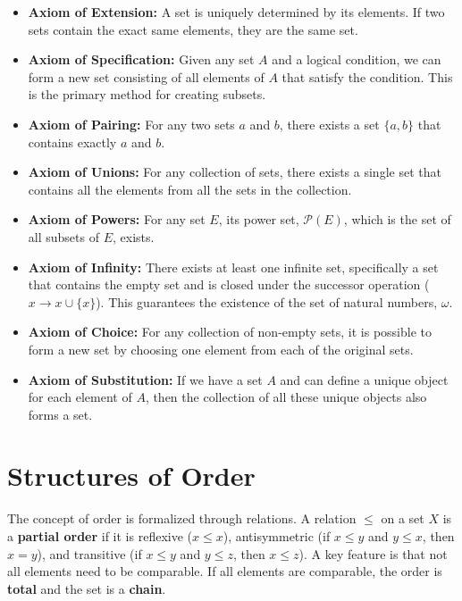\documentclass[11pt, a4paper]{article}
\begin{document}
\begin{itemize}
    \item \textbf{Axiom of Extension:} A set is uniquely determined by its elements. If two sets contain the exact same elements, they are the same set.
    \item \textbf{Axiom of Specification:} Given any set $A$ and a logical condition, we can form a new set consisting of all elements of $A$ that satisfy the condition. This is the primary method for creating subsets.
    \item \textbf{Axiom of Pairing:} For any two sets $a$ and $b$, there exists a set $\{a, b\}$ that contains exactly $a$ and $b$.
    \item \textbf{Axiom of Unions:} For any collection of sets, there exists a single set that contains all the elements from all the sets in the collection.
    \item \textbf{Axiom of Powers:} For any set $E$, its power set, $\mathcal{P}(E)$, which is the set of all subsets of $E$, exists.
    \item \textbf{Axiom of Infinity:} There exists at least one infinite set, specifically a set that contains the empty set and is closed under the successor operation ($x \to x \cup \{x\}$). This guarantees the existence of the set of natural numbers, $\omega$.
    \item \textbf{Axiom of Choice:} For any collection of non-empty sets, it is possible to form a new set by choosing one element from each of the original sets.
    \item \textbf{Axiom of Substitution:} If we have a set $A$ and can define a unique object for each element of $A$, then the collection of all these unique objects also forms a set.
\end{itemize}

\section{Structures of Order}
The concept of order is formalized through relations. A relation $\le$ on a set $X$ is a \textbf{partial order} if it is reflexive ($x \le x$), antisymmetric (if $x \le y$ and $y \le x$, then $x=y$), and transitive (if $x \le y$ and $y \le z$, then $x \le z$). A key feature is that not all elements need to be comparable. If all elements are comparable, the order is \textbf{total} and the set is a \textbf{chain}.
\end{document}
